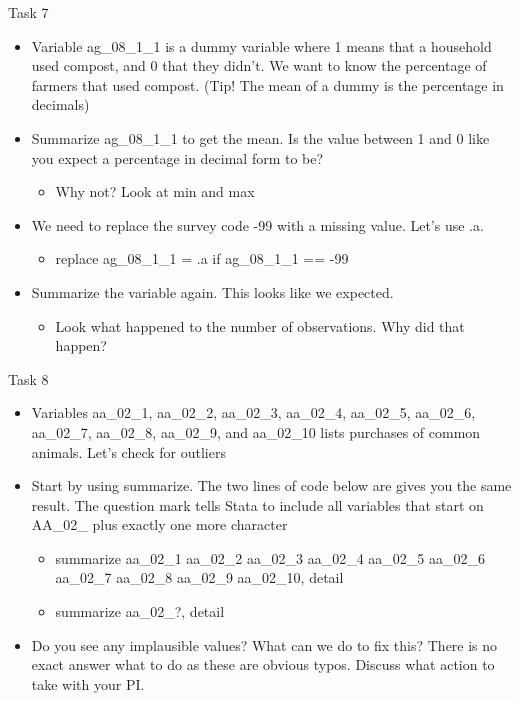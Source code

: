 \documentclass[aspectratio=169]{beamer}
\begin{document}
\begin{frame}{Task 7}
\begin{itemize}
	\item Variable ag\_08\_1\_1 is a dummy variable where 1 means that a household used compost, and 0 that they didn’t. We want to know the percentage of farmers that used compost. (Tip! The mean of a dummy is the percentage in decimals)
	\item Summarize ag\_08\_1\_1 to get the mean. Is the value between 1 and 0 like you expect a percentage in decimal form to be?
		\begin{itemize}
			\item 	Why not? Look at min and max
		\end{itemize}
	\item We need to replace the survey code -99 with a missing value. Let’s use .a.
		\begin{itemize}
			\item 	replace ag\_08\_1\_1 = .a if ag\_08\_1\_1 == -99
		\end{itemize}
	\item Summarize the variable again. This looks like we expected. 
		\begin{itemize}
			\item 	Look what happened to the number of observations. Why did that happen?
		\end{itemize}
\end{itemize}
\end{frame}

\begin{frame}{Task 8}
\begin{itemize}
	\item Variables aa\_02\_1, aa\_02\_2, aa\_02\_3, aa\_02\_4, aa\_02\_5, aa\_02\_6, aa\_02\_7, aa\_02\_8, aa\_02\_9,  and aa\_02\_10 lists purchases of common animals. Let’s check for outliers
	\item Start by using summarize. The two lines of code below are gives you the same result. The question mark tells Stata to include all variables that start on AA\_02\_ plus exactly one more character 
		\begin{itemize}
			\item summarize aa\_02\_1 aa\_02\_2 aa\_02\_3 aa\_02\_4 aa\_02\_5 aa\_02\_6 aa\_02\_7 aa\_02\_8 aa\_02\_9 aa\_02\_10, detail
			\item summarize aa\_02\_?, detail
		\end{itemize}	
	\item Do you see any implausible values? What can we do to fix this? There is no exact answer what to do as these are obvious typos. Discuss what action to take with your PI.
\end{itemize}
\end{frame}
\end{document}
